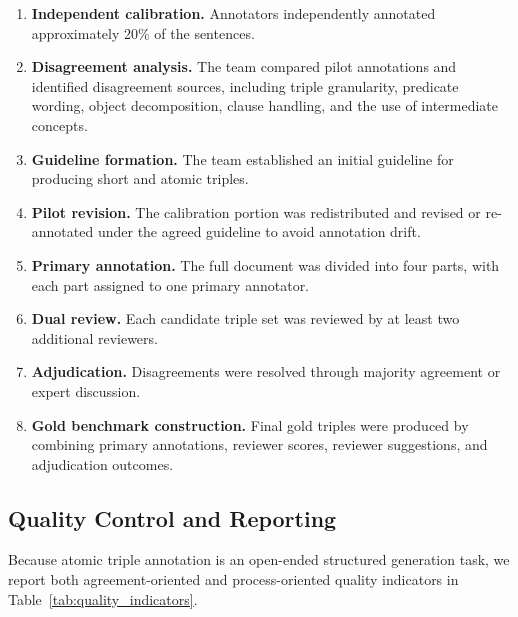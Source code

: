 \documentclass[conference]{IEEEtran}
\begin{document}
\begin{enumerate}
    \item \textbf{Independent calibration.}
    Annotators independently annotated approximately 20\% of the sentences.

    \item \textbf{Disagreement analysis.}
    The team compared pilot annotations and identified disagreement sources,
    including triple granularity, predicate wording, object decomposition,
    clause handling, and the use of intermediate concepts.

    \item \textbf{Guideline formation.}
    The team established an initial guideline for producing short and atomic triples.

    \item \textbf{Pilot revision.}
    The calibration portion was redistributed and revised or re-annotated under the
    agreed guideline to avoid annotation drift.

    \item \textbf{Primary annotation.}
    The full document was divided into four parts, with each part assigned to one
    primary annotator.

    \item \textbf{Dual review.}
    Each candidate triple set was reviewed by at least two additional reviewers.

    \item \textbf{Adjudication.}
    Disagreements were resolved through majority agreement or expert discussion.

    \item \textbf{Gold benchmark construction.}
    Final gold triples were produced by combining primary annotations, reviewer
    scores, reviewer suggestions, and adjudication outcomes.
\end{enumerate}

\subsection{Quality Control and Reporting}

Because atomic triple annotation is an open-ended structured generation task, we report both agreement-oriented and process-oriented quality indicators in Table~\ref{tab:quality_indicators}.
\end{document}
